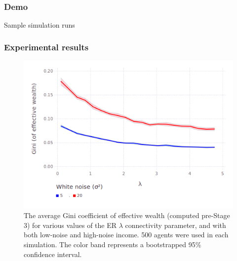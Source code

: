 \documentclass{beamer}
\begin{document}
\begin{frame}[t]
\frametitle{Demo}
\bigskip
\bigskip
\bigskip
\bigskip
\begin{center}
\huge
Sample simulation runs
\end{center}
\end{frame}

\begin{frame}[t]
\frametitle{Experimental results}
\begin{figure}[hb]
\centering
\includegraphics[scale=.4]{figures/giniVsLambda.png}
\caption{The average Gini coefficient of effective wealth (computed pre-Stage 3) for various values of the ER $\lambda$ connectivity parameter, and with both low-noise and high-noise income. 500 agents were used in each simulation. The color band represents a bootstrapped 95\% confidence interval.}
\label{fig:giniVsLambda}
\end{figure}
\end{frame}
\end{document}
